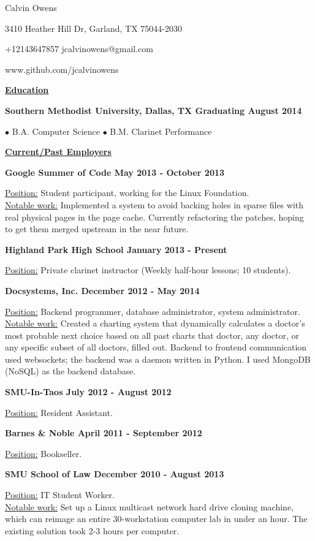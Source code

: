 \documentclass[11pt]{article}
\begin{document}
\centerline{{\Huge \sc Calvin Owens}}
\centerline{3410 Heather Hill Dr, Garland, TX 75044-2030}
\centerline{+12143647857 \textbullet \hspace{1pt} jcalvinowens@gmail.com}
\centerline{www.github.com/jcalvinowens}

\noindent
\hrulefill

\centerline{\underline{\bf Education}}
\bigskip
\centerline{\bf Southern Methodist University, Dallas, TX \hfill Graduating August 2014}
\centerline{\hfill $\bullet$ B.A. Computer Science \hfill $\bullet$ B.M. Clarinet Performance \hfill}

\noindent
\hrulefill

\centerline{\underline{\bf Current/Past Employers}}
\bigskip
\noindent\centerline{\bf Google Summer of Code \hfill May 2013 - October 2013}
\underline{Position:} Student participant, working for the Linux Foundation. \\
\underline{Notable work:} Implemented a system to avoid backing holes in sparse
files with real physical pages in the page cache. Currently refactoring the
patches, hoping to get them merged upstream in the near future.
\vspace*{6pt}\\
\noindent\centerline{\bf Highland Park High School \hfill January 2013 - Present}
\underline{Position:} Private clarinet instructor (Weekly half-hour lessons; 10 students).
\vspace*{6pt}\\
\noindent\centerline{\bf Docsystems, Inc. \hfill December 2012 - May 2014}
\underline{Position:} Backend programmer, database administrator, system administrator. \\
\underline{Notable work:} Created a charting system that dynamically calculates
a doctor's most probable next choice based on all past charts that doctor, any
doctor, or any specific subset of all doctors, filled out. Backend to frontend
communication used websockets; the backend was a daemon written in Python. I
used MongoDB (NoSQL) as the backend database.
\vspace*{6pt}\\
\noindent\centerline{\bf SMU-In-Taos \hfill July 2012 - August 2012}
\underline{Position:} Resident Assistant.
\vspace*{6pt}\\
\noindent\centerline{\bf Barnes \& Noble \hfill April 2011 - September 2012}
\underline{Position:} Bookseller.
\vspace*{6pt}\\
\noindent\centerline{\bf SMU School of Law \hfill December 2010 - August 2013}
\underline{Position:} IT Student Worker. \\
\underline{Notable work:} Set up a Linux multicast network hard drive cloning
machine, which can reimage an entire 30-workstation computer lab in under an
hour. The existing solution took 2-3 hours per computer.
\end{document}
